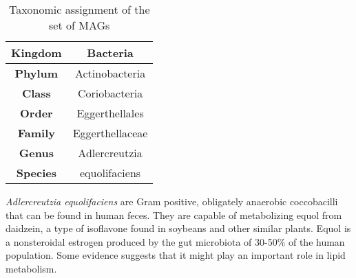 \begin{table}[h]
\centering
\begin{tabular}{|c|c|}
    \hline
    \textbf{Kingdom} & Bacteria \\
    \hline
    \textbf{Phylum} & Actinobacteria \\
    \hline
    \textbf{Class} & Coriobacteria \\
    \hline
    \textbf{Order} & Eggerthellales \\
    \hline
    \textbf{Family} & Eggerthellaceae \\
    \hline
    \textbf{Genus} & Adlercreutzia \\
    \hline
    \textbf{Species} & equolifaciens \\
    \hline
\end{tabular}
\caption{Taxonomic assignment of the set of MAGs}
\label{tab:taxonomy}
\end{table}

\textit{Adlercreutzia equolifaciens} are Gram positive, obligately anaerobic coccobacilli that can be found in human feces. They are capable of metabolizing equol from daidzein, a type of isoflavone found in soybeans and other similar plants\cite{Adlercreutzia}. Equol is a nonsteroidal estrogen produced by the gut microbiota of 30-50\% of the human population. Some evidence suggests that it might play an important role in lipid metabolism\cite{equol}.